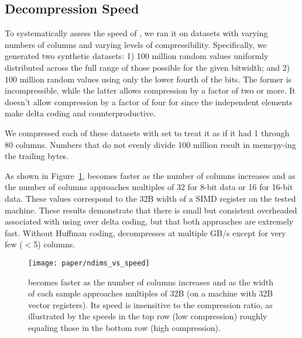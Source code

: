 


\subsection{Decompression Speed}

To systematically assess the speed of \minesp, we ran it on datasets with varying numbers of columns and varying levels of compressibility. Specifically, we generated two synthetic datasets: 1) 100 million random values uniformly distributed across the full range of those possible for the given bitwidth; and 2) 100 million random values using only the lower fourth of the bits. The former is incompressible, while the latter allows compression by a factor of two or more. It doesn't allow compression by a factor of four for \minesp since the independent elements make delta coding and \fire counterproductive.

We compressed each of these datasets with \minesp set to treat it as if it had 1 through 80 columns. Numbers that do not evenly divide 100 million result in \minesp memcpy-ing the trailing bytes.

As shown in Figure~\ref{fig:ndims_vs_speed}, \minesp becomes faster as the number of columns increases and as the number of columns approaches multiples of 32 for 8-bit data or 16 for 16-bit data. These values correspond to the 32B width of a SIMD register on the tested machine. These results demonstrate that there is small but consistent overheaded associated with using \fire over delta coding, but that both approaches are extremely fast. Without Huffman coding, \mine decompresses at multiple GB/s except for very few ($<$5) columns.

\begin{figure}[h]
\begin{center}
    \texttt{[image: paper/ndims\_vs\_speed]}
    \caption{\minesp becomes faster as the number of columns increases and as the width of each sample approaches multiples of 32B (on a machine with 32B vector registers). Its speed is insensitive to the compression ratio, as illustrated by the speeds in the top row (low compression) roughly equaling those in the bottom row (high compression).}
    \label{fig:ndims_vs_speed}
\end{center}
\end{figure}


